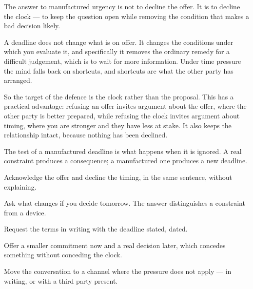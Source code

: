 


\begin{core}
The answer to manufactured urgency is not to decline the offer. It is to decline the clock --- to keep the question open while removing the condition that makes a bad decision likely.
\end{core}

\begin{mechanism}
A deadline does not change what is on offer. It changes the conditions under which you evaluate it, and specifically it removes the ordinary remedy for a difficult judgement, which is to wait for more information. Under time pressure the mind falls back on shortcuts, and shortcuts are what the other party has arranged.

So the target of the defence is the clock rather than the proposal. This has a practical advantage: refusing an offer invites argument about the offer, where the other party is better prepared, while refusing the clock invites argument about timing, where you are stronger and they have less at stake. It also keeps the relationship intact, because nothing has been declined.

The test of a manufactured deadline is what happens when it is ignored. A real constraint produces a consequence; a manufactured one produces a new deadline.
\end{mechanism}

\begin{application}
  \item Acknowledge the offer and decline the timing, in the same sentence, without explaining.
  \item Ask what changes if you decide tomorrow. The answer distinguishes a constraint from a device.
  \item Request the terms in writing with the deadline stated, dated.
  \item Offer a smaller commitment now and a real decision later, which concedes something without conceding the clock.
  \item Move the conversation to a channel where the pressure does not apply --- in writing, or with a third party present.
\end{application}

